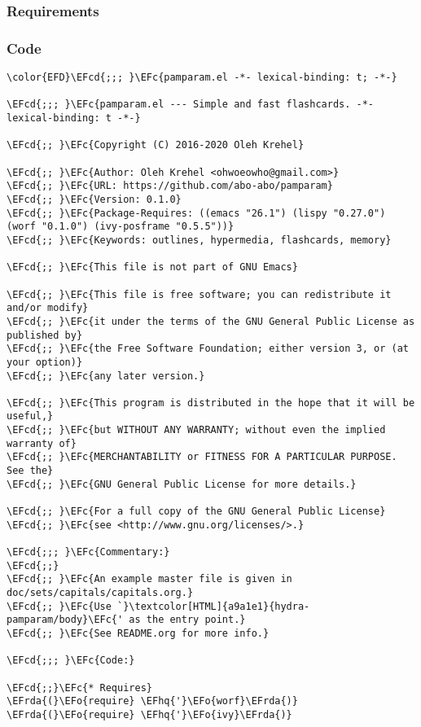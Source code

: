 \documentclass[a4wide,10pt]{article}
\newcommand{\EFc}[1]{\textcolor{EFc}{#1}} %
\newcommand{\EFcd}[1]{\textcolor{EFcd}{#1}} %
\newcommand{\EFo}[1]{\textcolor{EFo}{#1}} %
\newcommand{\EFhq}[1]{\textcolor{EFhq}{#1}} %
\newcommand{\EFrda}[1]{\textcolor{EFrda}{#1}} %
\begin{document}
\subsubsection{Requirements}
\label{sec:org4a6b7ed}
\subsubsection{Code}
\label{sec:orga7fe1e4}
\begin{Code}
\begin{Verbatim}
\color{EFD}\EFcd{;;; }\EFc{pamparam.el -*- lexical-binding: t; -*-}

\EFcd{;;; }\EFc{pamparam.el --- Simple and fast flashcards. -*- lexical-binding: t -*-}

\EFcd{;; }\EFc{Copyright (C) 2016-2020 Oleh Krehel}

\EFcd{;; }\EFc{Author: Oleh Krehel <ohwoeowho@gmail.com>}
\EFcd{;; }\EFc{URL: https://github.com/abo-abo/pamparam}
\EFcd{;; }\EFc{Version: 0.1.0}
\EFcd{;; }\EFc{Package-Requires: ((emacs "26.1") (lispy "0.27.0") (worf "0.1.0") (ivy-posframe "0.5.5"))}
\EFcd{;; }\EFc{Keywords: outlines, hypermedia, flashcards, memory}

\EFcd{;; }\EFc{This file is not part of GNU Emacs}

\EFcd{;; }\EFc{This file is free software; you can redistribute it and/or modify}
\EFcd{;; }\EFc{it under the terms of the GNU General Public License as published by}
\EFcd{;; }\EFc{the Free Software Foundation; either version 3, or (at your option)}
\EFcd{;; }\EFc{any later version.}

\EFcd{;; }\EFc{This program is distributed in the hope that it will be useful,}
\EFcd{;; }\EFc{but WITHOUT ANY WARRANTY; without even the implied warranty of}
\EFcd{;; }\EFc{MERCHANTABILITY or FITNESS FOR A PARTICULAR PURPOSE.  See the}
\EFcd{;; }\EFc{GNU General Public License for more details.}

\EFcd{;; }\EFc{For a full copy of the GNU General Public License}
\EFcd{;; }\EFc{see <http://www.gnu.org/licenses/>.}

\EFcd{;;; }\EFc{Commentary:}
\EFcd{;;}
\EFcd{;; }\EFc{An example master file is given in doc/sets/capitals/capitals.org.}
\EFcd{;; }\EFc{Use `}\textcolor[HTML]{a9a1e1}{hydra-pamparam/body}\EFc{' as the entry point.}
\EFcd{;; }\EFc{See README.org for more info.}

\EFcd{;;; }\EFc{Code:}

\EFcd{;;}\EFc{* Requires}
\EFrda{(}\EFo{require} \EFhq{'}\EFo{worf}\EFrda{)}
\EFrda{(}\EFo{require} \EFhq{'}\EFo{ivy}\EFrda{)}


\end{Verbatim}
\end{Code}
\end{document}
